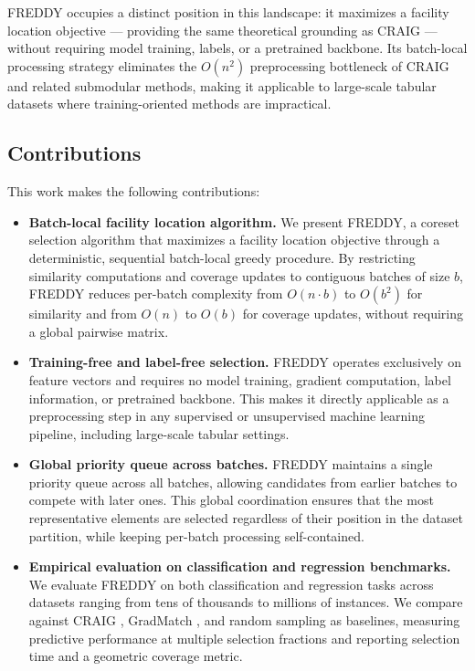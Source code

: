 \documentclass{article}
\begin{document}
FREDDY occupies a distinct position in this landscape: it maximizes a facility location objective — providing the same theoretical grounding as CRAIG — without requiring model training, labels, or a pretrained backbone. Its batch-local processing strategy eliminates the $O(n^2)$ preprocessing bottleneck of CRAIG and related submodular methods, making it applicable to large-scale tabular datasets where training-oriented methods are impractical.

\subsection{Contributions}

This work makes the following contributions:

\begin{itemize}
    \item \textbf{Batch-local facility location algorithm.}
    We present FREDDY, a coreset selection algorithm that maximizes a facility location objective through a deterministic, sequential batch-local greedy procedure.
    By restricting similarity computations and coverage updates to contiguous batches of size $b$, FREDDY reduces per-batch complexity from $O(n \cdot b)$ to $O(b^2)$ for similarity and from $O(n)$ to $O(b)$ for coverage updates, without requiring a global pairwise matrix.

    \item \textbf{Training-free and label-free selection.}
    FREDDY operates exclusively on feature vectors and requires no model training, gradient computation, label information, or pretrained backbone.
    This makes it directly applicable as a preprocessing step in any supervised or unsupervised machine learning pipeline, including large-scale tabular settings.

    \item \textbf{Global priority queue across batches.}
    FREDDY maintains a single priority queue across all batches, allowing candidates from earlier batches to compete with later ones.
    This global coordination ensures that the most representative elements are selected regardless of their position in the dataset partition, while keeping per-batch processing self-contained.

    \item \textbf{Empirical evaluation on classification and regression benchmarks.}
    We evaluate FREDDY on both classification and regression tasks across datasets ranging from tens of thousands to millions of instances.
    We compare against CRAIG \cite{Mirzasoleiman2020Coresets}, GradMatch \cite{Killamsetty2021GradMatch}, and random sampling as baselines, measuring predictive performance at multiple selection fractions and reporting selection time and a geometric coverage metric.
\end{itemize}
\end{document}
